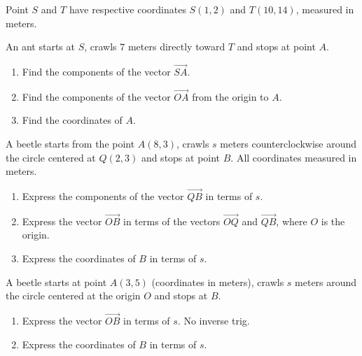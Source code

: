 \documentclass{ximera}
\begin{document}
\begin{question}  \label{QOKDlerdfsre}
Point $S$ and $T$ have respective coordinates $S(1,2)$ and $T(10,14)$, measured in meters.

An ant starts at $S$, crawls $7$ meters directly toward $T$ and stops at point $A$.

\begin{enumerate}
\item Find the components of the vector $\overrightarrow{SA}$.

\item Find the components of the vector $\overrightarrow{OA}$ from the origin to $A$.

\item Find the coordinates of $A$.
\end{enumerate}

\end{question}


\begin{question}  \label{QDfgegsE}
A beetle starts from the point $A(8,3)$, crawls $s$ meters counterclockwise around the circle centered at $Q(2,3)$ and stops at point $B$. All coordinates measured in meters.

\begin{enumerate}
\item Express the components of the vector $\overrightarrow{QB}$ in terms of $s$.

\item Express the vector $\overrightarrow{OB}$ in terms of the vectors $\overrightarrow{OQ}$ and $\overrightarrow{QB}$, where $O$ is the origin.

\item Express the coordinates of $B$ in terms of $s$.
\end{enumerate}
\end{question}


\begin{question} \label{QIDIFDfeD}
A beetle starts at point $A(3,5)$ (coordinates in meters), crawls $s$ meters around the circle centered at the origin $O$ and stops at $B$.

\begin{enumerate}
\item Express the vector $\overrightarrow{OB}$ in terms of $s$. No inverse trig.

\item Express the coordinates of $B$ in terms of $s$.
\end{enumerate}
\end{question}
\end{document}
